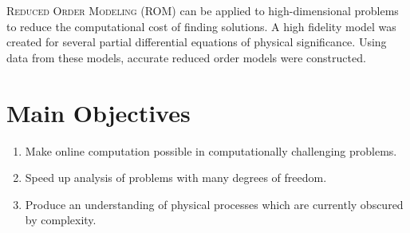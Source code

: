 \documentclass{a0poster}
\makeatletter
\renewenvironment{abstract}{%
    \if@twocolumn
      \section*{\abstractname}%
    \else %
      \begin{center}%
        {\bfseries \LARGE\abstractname\vspace{\z@}}%
      \end{center}%
      \quotation
    \fi}
    {\if@twocolumn\else\endquotation\fi}
\makeatother
\begin{document}
\begin{multicols}{3} %


\color{Navy} %

\hrulefill
\vspace{0.5cm}
\begin{abstract}
\LARGE

\textsc{Reduced Order Modeling} (ROM) can be applied to high-dimensional problems to reduce the computational cost of finding solutions. A high fidelity model was created for several partial differential equations of physical significance. Using data from these models, accurate reduced order models were constructed.

\end{abstract}
\hrulefill


\color{Black} %
\section{Main Objectives}
\LARGE
\begin{enumerate}
\item Make online computation possible in computationally challenging problems.
\item Speed up analysis of problems with many degrees of freedom.
\item Produce an understanding of physical processes which are currently obscured by complexity.
\end{enumerate}


\end{multicols}
\end{document}

